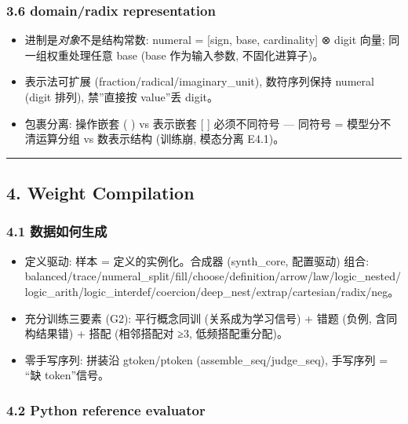 \documentclass[
]{article}
\providecommand{\tightlist}{%
  \setlength{\itemsep}{0pt}\setlength{\parskip}{0pt}}
\begin{document}
\subsubsection{3.6 domain/radix
representation}\label{domainradix-representation}

\begin{itemize}
\tightlist
\item
  进制是\emph{对象}不是结构常数: numeral = {[}sign, base, cardinality{]}
  ⊗ digit 向量; 同一组权重处理任意 base (base 作为输入参数,
  不固化进算子)。
\item
  表示法可扩展 (fraction/radical/imaginary\_unit), 数符序列保持 numeral
  (digit 排列), 禁''直接按 value''丢 digit。
\item
  包裹分离: 操作嵌套 ( ) vs 表示嵌套 {[} {]} 必须不同符号 --- 同符号 =
  模型分不清运算分组 vs 数表示结构 (训练崩, 模态分离 E4.1)。
\end{itemize}

\begin{center}\rule{0.5\linewidth}{0.5pt}\end{center}

\subsection{4. Weight Compilation}\label{weight-compilation}

\subsubsection{4.1
数据如何生成}\label{ux6570ux636eux5982ux4f55ux751fux6210}

\begin{itemize}
\tightlist
\item
  定义驱动: 样本 = 定义的实例化。合成器 (synth\_core, 配置驱动) 组合:
  balanced/trace/numeral\_split/fill/choose/definition/arrow/law/logic\_nested/logic\_arith/logic\_interdef/coercion/deep\_nest/extrap/cartesian/radix/neg。
\item
  充分训练三要素 (G2): 平行概念同训 (关系成为学习信号) + 错题 (负例,
  含同构结果错) + 搭配 (相邻搭配对 ≥3, 低频搭配重分配)。
\item
  零手写序列: 拼装沿 gtoken/ptoken (assemble\_seq/judge\_seq), 手写序列
  = ``缺 token''信号。
\end{itemize}

\subsubsection{4.2 Python reference
evaluator}\label{python-reference-evaluator}
\end{document}
